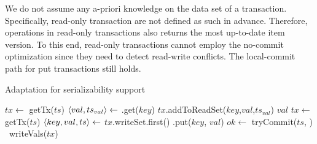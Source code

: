 %
We do not assume any a-priori knowledge on the data set of a transaction.
Specifically, read-only transaction are not defined as such in advance.
Therefore, {} operations in read-only transactions also returns the most up-to-date item
version. To this end,
read-only transactions cannot employ the no-commit optimization since they need to detect read-write conflicts. 
The local-commit path for put transactions still holds.

\begin{algorithm}[t]
\small 
\caption{Adaptation for serializability support} \label{alg:ser}
\begin{algorithmic}[1]
\makeatletter\setcounter{ALG@line}{100}\makeatother

	\State $tx \gets$ getTx($ts$) 
	\State $\left\langle {val,ts_{val}} \right\rangle \gets$ \dbserver.get($key$)  \label{line:ser:get}
	\State $tx$.addToReadSet($key$,$val$,$ts_{val}$)
	\State \Return $val$
\EndFunction
\vspace{7pt}
	\State $tx \gets$ getTx($ts$) 
		\State $\left\langle {key,val,ts} \right\rangle \gets$ $tx$.writeSet.first()
		\State \dbserver.put($key$, $val$)  \label{line:ser:localupdate}
		\State \Return {}
	\EndIf
	\State $ok \gets$ tryCommit($ts$, ) \label{line:ser:trycommit}
			\Return \label{line:ser:readonly}
		\Else\ 
			writeVals($tx$) \label{line:ser:writevals}
		\EndIf
	\EndIf
\EndFunction


\end{algorithmic}
\end{algorithm}

